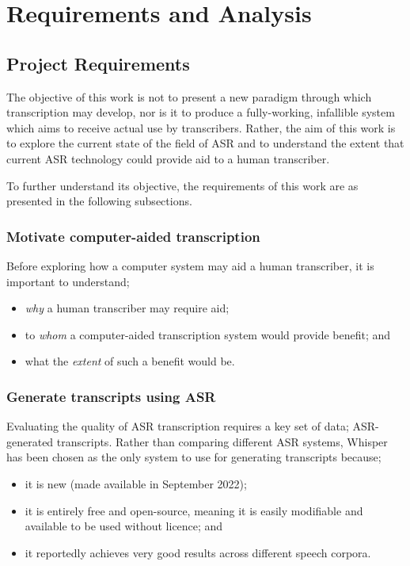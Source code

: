 \chapter{Requirements and Analysis}\label{ch:req-and-analysis}

\section{Project Requirements}\label{sec:requirements}

The objective of this work is not to present a new paradigm through which transcription may develop, nor is it to produce a fully-working, infallible system which aims to receive actual use by transcribers.
Rather, the aim of this work is to explore the current state of the field of ASR and to understand the extent that current ASR technology could provide aid to a human transcriber.

To further understand its objective, the requirements of this work are as presented in the following subsections.

\subsection{Motivate computer-aided transcription}

Before exploring how a computer system may aid a human transcriber, it is important to understand;

\begin{itemize}
        \item \emph{why} a human transcriber may require aid;
        \item to \emph{whom} a computer-aided transcription system would provide benefit; and
        \item what the \emph{extent} of such a benefit would be.
\end{itemize}

\subsection{Generate transcripts using ASR}

Evaluating the quality of ASR transcription requires a key set of data; ASR-generated transcripts.
Rather than comparing different ASR systems, Whisper\cite{whisper} has been chosen as the only system to use for generating transcripts because;

\begin{itemize}
        \item it is new (made available in September 2022);
        \item it is entirely free and open-source, meaning it is easily modifiable and available to be used without licence; and
        \item it reportedly achieves very good results across different speech corpora.
\end{itemize}

